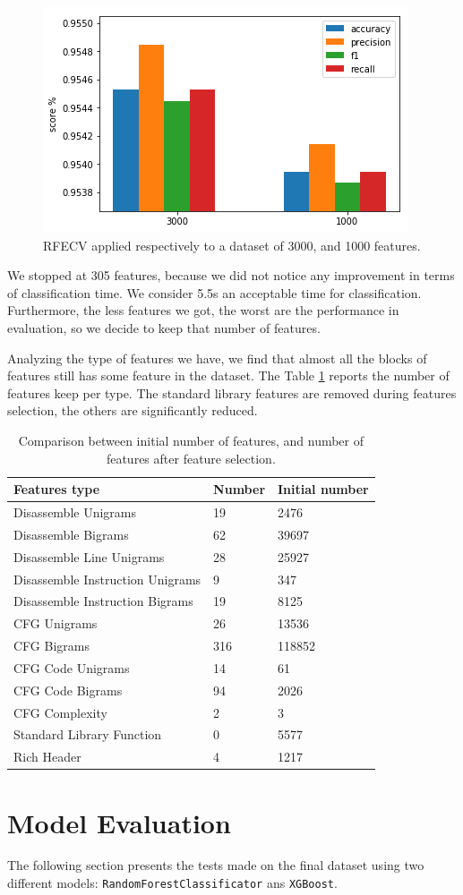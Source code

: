 \begin{figure}[]
	\centering
	\includegraphics[width=0.6\columnwidth]{rfecv-confronto.png}
	\caption{RFECV applied respectively to a dataset of 3000, and 1000 features.}
	\label{fig:rfecv-comparison}
\end{figure}

We stopped at 305 features, because we did not notice any improvement in terms of classification time. We consider 5.5s an acceptable time for classification. Furthermore, the less features we got, the worst are the performance in evaluation, so we decide to keep that number of features.

Analyzing the type of features we have, we find that almost all the blocks of features still has some feature in the dataset. The Table \ref{tab:num-feat-842} reports the number of features keep per type. The standard library features are removed during features selection, the others are significantly reduced.  

\begin{table}[]
	\caption{Comparison between initial number of features, and number of features after feature selection.}
	\label{tab:num-feat-842}
	\begin{tabular}{lll}
		\toprule
		Features type                    & Number & Initial number\\
		\midrule
		Disassemble Unigrams   &19 & 2476           \\
		Disassemble Bigrams    &62   & 39697          \\
		Disassemble Line Unigrams  &28& 25927          \\
		Disassemble Instruction Unigrams & 9 & 347   \\
		Disassemble Instruction Bigrams  & 19 & 8125    \\
		CFG Unigrams    &26 & 13536   \\
		CFG Bigrams      &316 & 118852  \\
		CFG Code Unigrams  & 14 & 61     \\
		CFG Code Bigrams   & 94 & 2026  \\
		CFG Complexity          & 2 & 3     \\
		Standard Library Function & 0 & 5577  \\
		Rich Header   & 4 & 1217  \\
		\bottomrule	
	\end{tabular}
\end{table}


\section{Model Evaluation}

The following section presents the tests made on the final dataset using two different models: \texttt{RandomForestClassificator} ans \texttt{XGBoost}.

